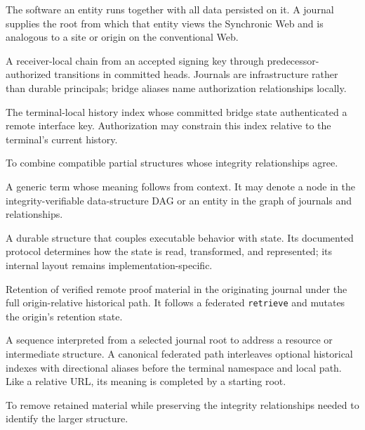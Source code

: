 \begin{description}[style=nextline]
  \item[Journal]
    The software an entity runs together with all data persisted on it. A journal supplies the root from which that entity views the Synchronic Web and is analogous to a site or origin on the conventional Web.

  \item[Journal signing-key continuity]
    A receiver-local chain from an accepted signing key through predecessor-authorized transitions in committed heads. Journals are infrastructure rather than durable principals; bridge aliases name authorization relationships locally.

  \item[Key-index]
    The terminal-local history index whose committed bridge state authenticated a remote interface key. Authorization may constrain this index relative to the terminal's current history.

  \item[Merge]
    To combine compatible partial structures whose integrity relationships agree.

  \item[Node]
    A generic term whose meaning follows from context. It may denote a node in the integrity-verifiable data-structure DAG or an entity in the graph of journals and relationships.

  \item[Object]
    A durable structure that couples executable behavior with state. Its documented protocol determines how the state is read, transformed, and represented; its internal layout remains implementation-specific.

  \item[Origin-local pin]
    Retention of verified remote proof material in the originating journal under the full origin-relative historical path. It follows a federated \texttt{retrieve} and mutates the origin's retention state.

  \item[Path]
    A sequence interpreted from a selected journal root to address a resource or intermediate structure. A canonical federated path interleaves optional historical indexes with directional aliases before the terminal namespace and local path. Like a relative URL, its meaning is completed by a starting root.

  \item[Prune]
    To remove retained material while preserving the integrity relationships needed to identify the larger structure.


\end{description}

